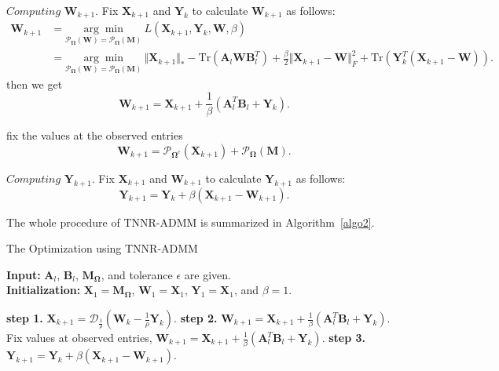 \documentclass{article}
\begin{document}
{$\textit{Computing}$  $\mathbf W_{k+1}$. Fix $\mathbf X_{k+1}$ and $\mathbf Y_k$ to calculate $\mathbf W_{k+1}$ as follows:
\begin{equation}
\begin{aligned}
    \mathbf W_{k+1}& = \underset{\mathcal{P}_{\mathbf\Omega}(\mathbf W) = \mathcal{P}_{\mathbf\Omega}(\mathbf M)}{\arg\min} \ L(\mathbf X_{k+1},\mathbf Y_k,\mathbf W,\beta) \\
    & =  \underset{\mathcal{P}_{\mathbf\Omega}(\mathbf W) = \mathcal{P}_{\mathbf\Omega}(\mathbf M)}{\arg\min} \ \Vert\mathbf X_{k+1}\Vert_* - \text{Tr}(\mathbf A_l \mathbf W \mathbf B_l^T)    + \frac{\beta}{2}\Vert\mathbf X_{k+1}-\mathbf W \Vert_F^2 + \text{Tr}(\mathbf Y_k^T(\mathbf X_{k+1}-\mathbf W)).
\end{aligned}
\end{equation}
then we get
\begin{equation}
    \mathbf W_{k+1} = \mathbf X_{k+1} + \frac{1}{\beta}(\mathbf A_l^T\mathbf B_l + \mathbf Y_k).
\end{equation}

fix the values at the observed entries
\begin{equation}
    \mathbf W_{k+1} = \mathcal{P}_{\mathbf  \Omega^c}(\mathbf X_{k+1}) + \mathcal{P}_{\mathbf \Omega}(\mathbf M).
\end{equation}

$\textit{Computing}$  $\mathbf Y_{k+1}$. Fix $\mathbf X_{k+1}$ and $\mathbf W_{k+1}$ to calculate $\mathbf Y_{k+1}$ as follows:
\begin{equation}
    \mathbf Y_{k+1} = \mathbf Y_{k} + \beta(\mathbf X_{k+1} - \mathbf W_{k+1}).
\end{equation}

The whole procedure of TNNR-ADMM is summarized in Algorithm~\ref{algo2}.


\begin{algorithm}[t]
    \caption{The Optimization using TNNR-ADMM}
    \label{algo2}
    \textbf{Input:} $\mathbf A_l$, $\mathbf B_l$, $\mathbf M_{\mathbf\Omega}$, and tolerance $\epsilon$ are given.\\
    \textbf{Initialization:} $\mathbf X_1 = \mathbf M_{\mathbf\Omega}$, $\mathbf W_1 = \mathbf X_1$, $\mathbf Y_1=\mathbf X_1$, and $\beta = 1$. 
    \begin{algorithmic}
        \Repeat 
        \State \textbf{step 1.} $\mathbf X_{k+1} = \mathcal{D}_{\frac{1}{\rho}}(\mathbf W_k - \frac{1}{\rho}\mathbf Y_k)$.
        \State \textbf{step 2.} $\mathbf W_{k+1} = \mathbf X_{k+1} + \frac{1}{\beta}(\mathbf A_l^T\mathbf B_l + \mathbf Y_k)$.
        \State Fix values at observed entries, 
        $\mathbf W_{k+1} = \mathbf X_{k+1} + \frac{1}{\beta}(\mathbf A_l^T\mathbf B_l + \mathbf Y_k)$.
        \State \textbf{step 3.} $\mathbf Y_{k+1} = \mathbf Y_{k} + \beta(\mathbf X_{k+1} -\mathbf W_{k+1})$.
    \end{algorithmic}
\end{algorithm}

}
\end{document}
